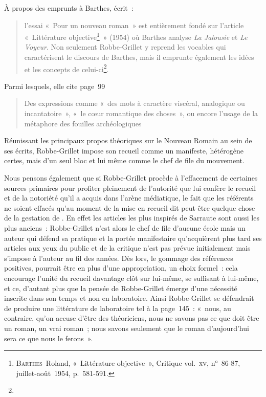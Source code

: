 \documentclass[12pt, a4paper]{article}
\begin{document}
À propos des emprunts à Barthes, \galia{} écrit~:
\begin{quote}
l’essai «~Pour un nouveau roman~» est entièrement fondé sur l’article «~Littérature objective\footnote{\textsc{Barthes}~Roland, «~Littérature objective~», Critique vol.~\textsc{xv}, n°~86-87, juillet-août~1954, p.~581-591.}~» (1954) où Barthes analyse \textit{La Jalousie} et \textit{Le Voyeur}. Non seulement Robbe-Grillet y reprend les vocables qui caractérisent le discours de Barthes, mais il emprunte également les idées et les concepts de celui-ci\footnote{}.    
\end{quote}
Parmi lesquels, elle cite page~99
\begin{quote}
Des expressions comme «~des mots à caractère viscéral, analogique ou incantatoire~», «~le cœur romantique des choses~», ou encore l’usage de la métaphore des fouilles archéologiques
\end{quote}

Réunissant les principaux propos théoriques sur le Nouveau Romain au sein de ses écrits, Robbe-Grillet impose son recueil comme un manifeste, hétérogène certes, mais d'un seul bloc et lui même comme le chef de file du mouvement.










Nous pensons également que si Robbe-Grillet procède à l'effacement de certaines sources primaires pour profiter pleinement de l'autorité que lui confère le recueil et de la notoriété qu'il a acquis dans l'arène médiatique, le fait que les référents ne soient effacés qu'au moment de la mise en recueil dit peut-être quelque chose de la gestation de \punr. En effet les articles les plus inspirés de Sarraute sont aussi les plus anciens~: Robbe-Grillet n'est alors le chef de file d'aucune école mais un auteur qui défend sa pratique et la portée manifestaire qu'acquièrent plus tard ses articles aux yeux du public et de la critique n'est pas prévue initialement mais s'impose à l'auteur au fil des années. Dès lors, le gommage des références positives, pourrait être en plus d'une appropriation, un choix formel~: cela encourage l'unité du recueil davantage clôt sur lui-même, se suffisant à lui-même, et ce, d'autant plus que la pensée de Robbe-Grillet émerge d'une nécessité inscrite dans son temps et non en laboratoire. Ainsi Robbe-Grillet se défendrait de produire une littérature de laboratoire tel à la page~145~: «~nous, au contraire, qu’on accuse d’être des théoriciens, nous ne savons pas ce que doit être un roman, un vrai roman~; nous savons seulement que le roman d’aujourd’hui sera ce que nous le ferons~».
\end{document}
